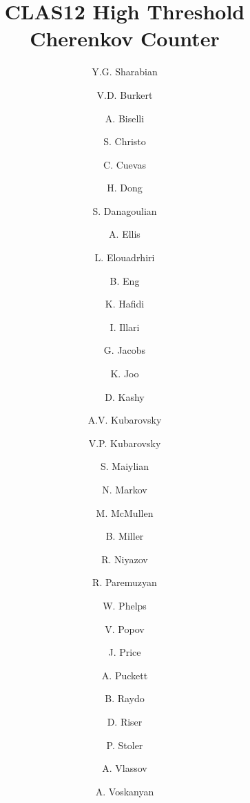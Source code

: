 \title{CLAS12 High Threshold Cherenkov Counter}

\author[1]{Y.G. Sharabian}
\author[1]{V.D. Burkert}
\author[2]{A. Biselli}
\author[1]{S. Christo}
\author[1]{C. Cuevas}
\author[1]{H. Dong}
\author[3]{S. Danagoulian}
\author[1]{A. Ellis}
\author[1]{L. Elouadrhiri}
\author[1]{B. Eng}
\author[4]{K. Hafidi}
\author[5]{I. Illari}
\author[1]{G. Jacobs}
\author[6]{K. Joo}
\author[1]{D. Kashy}
\author[6]{A.V. Kubarovsky}
\author[1]{V.P. Kubarovsky}
\author[7]{S. Maiylian}
\author[1]{N. Markov}
\author[1]{M. McMullen}
\author[1]{B. Miller}
\author[8]{R. Niyazov}
\author[9]{R. Paremuzyan}
\author[10]{W. Phelps}
\author[1]{V. Popov}
\author[11]{J. Price}
\author[6]{A. Puckett}
\author[1]{B. Raydo}
\author[6]{D. Riser}
\author[8]{P. Stoler}
\author[12]{A. Vlassov}
\author[7]{A. Voskanyan}

\address[1]{Thomas Jefferson National Accelerator Facility, Newport News, VA 23606}
\address[2]{Fairfield University, Fairfield, CT 06824}
\address[3]{North Carolina Agricultural and Technical State University, Greensboro, NC 27411}
\address[4]{Argonne National Laboratory, Argonne, IL 60439}
\address[5]{The George Washington University, Washington, DC 20052}
\address[6]{University of Connecticut, Storrs, CT 06269}
\address[7]{Yerevan Physics Institute, 375036 Yerevan, Armenia}
\address[8]{Rensselaer Polytechnic Institute, Troy, NY 12180}
\address[9]{University of New Hampshire, Durham, NH 03824}
\address[10]{Christopher Newport University, Newport News, VA 23606}
\address[11]{California State University, Dominguez Hills, Carson, CA 90747}
\address[12]{National Research Center Kurchatov Institute - ITEP, 117259, Moscow, Russia}
